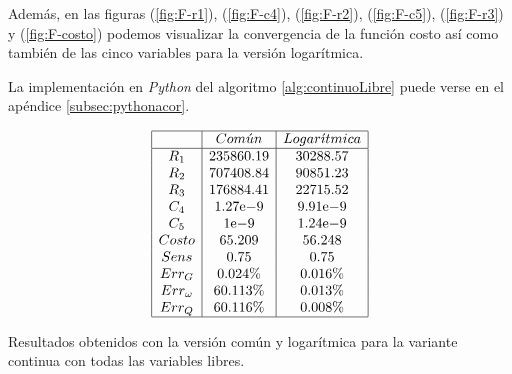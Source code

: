 \documentclass{llncs}
\newcommand{\expnumber}[2]{{#1}\mathrm{e}{#2}}
\begin{document}
	Además, en las figuras (\ref{fig:F-r1}), (\ref{fig:F-c4}), (\ref{fig:F-r2}), (\ref{fig:F-c5}), (\ref{fig:F-r3}) y (\ref{fig:F-costo}) 
	podemos visualizar la convergencia de la función costo así como también de las cinco variables para la versión logarítmica.
	
	La implementación en \textit{Python} del algoritmo \ref{alg:continuoLibre} puede verse en el apéndice \ref{subsec:pythonacor}.
	
	\begin{table}[!h]
		$$
		\begin{array}{|c|c|c|}
		\hline
		 & Com\acute{u}n & Logar\acute{\imath}tmica \\
                \hline
                R_1 & 235860.19  & 30288.57 \\
                R_2 & 707408.84 & 90851.23 \\
                R_3 & 176884.41  & 22715.52 \\
                C_4 & \expnumber{1.27}{-9}  & \expnumber{9.91}{-9}\\
                C_5 & \expnumber{1}{-9} & \expnumber{1.24}{-9}\\
                Costo & 65.209 &  56.248\\
                Sens & 0.75 & 0.75 \\
                Err_G & 0.024\%  & 0.016\%\\
                Err_{\omega} & 60.113\%  &  0.013\%\\
                Err_Q & 60.116\%  &  0.008\%\\
		\hline
		\end{array}
		$$
		\caption{Resultados obtenidos con la versión común y logarítmica para la variante continua con todas las variables libres.}
		\label{cuadroSols1}
	\end{table}
	
\end{document}
